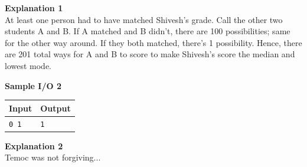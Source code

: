 \documentclass{article}
\begin{document}
{\noindent \bf Explanation 1}\\
At least one person had to have matched Shivesh's grade. Call the other two students A and B. If A matched and B didn't, there are 100 possibilities; same for the other way around. If they both matched, there's 1 possibility. Hence, there are 201 total ways for A and B to score to make Shivesh's score the median and lowest mode. \newline

{\noindent \bf Sample I/O 2}\\
\begin{tabular}{|p{}|p{}|}
    \hline
    \textbf{Input} & \textbf{Output}\\
    \hline
    \texttt{0 1}
    &
    \texttt{1}\\
    \hline
\end{tabular} \newline \newline

{\noindent \bf Explanation 2}\\
Temoc was not forgiving...
\end{document}
